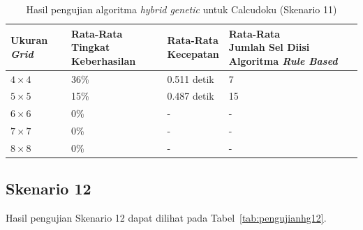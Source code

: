 \begin{table}
\centering
\captionsetup{justification=centering}
\caption[Hasil pengujian algoritma \textit{hybrid genetic} untuk Calcudoku (Skenario 11)]{Hasil pengujian algoritma \textit{hybrid genetic} untuk Calcudoku (Skenario 11)}
\begin{tabular}{| l | l | l | l |}
\hline
Ukuran \textit{Grid} & \makecell[l]{Rata-Rata \\ Tingkat Keberhasilan} & \makecell[l]{Rata-Rata \\ Kecepatan} & \makecell[l]{Rata-Rata \\ Jumlah Sel Diisi Algoritma \textit{Rule Based}} \\
\hline \hline
\begin{math}4 \times 4\end{math} & 36\% & 0.511 detik & 7 \\
\hline
\begin{math}5 \times 5\end{math} & 15\% & 0.487 detik & 15 \\
\hline
\begin{math}6 \times 6\end{math} & 0\% & - & - \\
\hline
\begin{math}7 \times 7\end{math} & 0\% & - & - \\
\hline
\begin{math}8 \times 8\end{math} & 0\% & - & - \\
\hline
\end{tabular}
\label{tab:pengujianhg11}
\end{table}

\subsection{Skenario 12}
\label{sec:skenario12}

Hasil pengujian Skenario 12 dapat dilihat pada Tabel~\ref{tab:pengujianhg12}.

